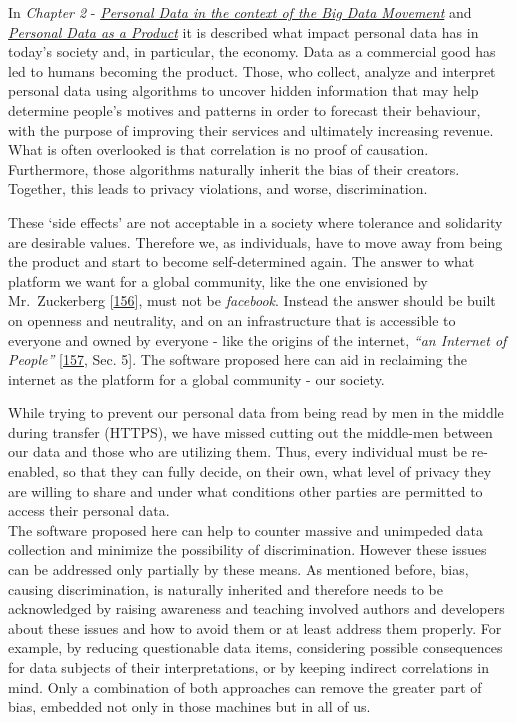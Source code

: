 \documentclass[12pt,english,a4paper,titlepage,cleardoublepage=empty,dottedtoc]{report}
\begin{document}
In \emph{Chapter 2} -
\emph{\protect\hyperlink{personal-data-in-the-context-of-the-big-data-movement}{Personal
Data in the context of the Big Data Movement}} and
\emph{\protect\hyperlink{personal-data-as-a-product}{Personal Data as a
Product}} it is described what impact personal data has in today's
society and, in particular, the economy. Data as a commercial good has
led to humans becoming the product. Those, who collect, analyze and
interpret personal data using algorithms to uncover hidden information
that may help determine people's motives and patterns in order to
forecast their behaviour, with the purpose of improving their services
and ultimately increasing revenue. What is often overlooked is that
correlation is no proof of causation. Furthermore, those algorithms
naturally inherit the bias of their creators. Together, this leads to
privacy violations, and worse, discrimination.

These `side effects' are not acceptable in a society where tolerance and
solidarity are desirable values. Therefore we, as individuals, have to
move away from being the product and start to become self-determined
again. The answer to what platform we want for a global community, like
the one envisioned by Mr.~Zuckerberg
{[}\protect\hyperlink{ref-web_2017_facebook_building-global-community}{156}{]},
must not be \emph{facebook}. Instead the answer should be built on
openness and neutrality, and on an infrastructure that is accessible to
everyone and owned by everyone - like the origins of the internet,
\emph{``an Internet of People''}
{[}\protect\hyperlink{ref-web_2017_encouraging-individual-sovereignty}{157},
Sec. 5{]}. The software proposed here can aid in reclaiming the internet
as the platform for a global community - our society.

While trying to prevent our personal data from being read by men in the
middle during transfer (HTTPS), we have missed cutting out the
middle-men between our data and those who are utilizing them. Thus,
every individual must be re-enabled, so that they can fully decide, on
their own, what level of privacy they are willing to share and under
what conditions other parties are permitted to access their personal
data.\\
The software proposed here can help to counter massive and unimpeded
data collection and minimize the possibility of discrimination. However
these issues can be addressed only partially by these means. As
mentioned before, bias, causing discrimination, is naturally inherited
and therefore needs to be acknowledged by raising awareness and teaching
involved authors and developers about these issues and how to avoid them
or at least address them properly. For example, by reducing questionable
data items, considering possible consequences for data subjects of their
interpretations, or by keeping indirect correlations in mind. Only a
combination of both approaches can remove the greater part of bias,
embedded not only in those machines but in all of us.
\end{document}
